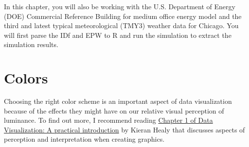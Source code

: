 \documentclass[
]{book}
\newenvironment{Shaded}{\begin{snugshade}}{\end{snugshade}}
\newcommand{\AttributeTok}[1]{\textcolor[rgb]{0.77,0.63,0.00}{#1}}
\newcommand{\DocumentationTok}[1]{\textcolor[rgb]{0.56,0.35,0.01}{\textbf{\textit{#1}}}}
\newcommand{\FunctionTok}[1]{\textcolor[rgb]{0.00,0.00,0.00}{#1}}
\newcommand{\NormalTok}[1]{#1}
\newcommand{\OtherTok}[1]{\textcolor[rgb]{0.56,0.35,0.01}{#1}}
\newcommand{\SpecialCharTok}[1]{\textcolor[rgb]{0.00,0.00,0.00}{#1}}
\newcommand{\StringTok}[1]{\textcolor[rgb]{0.31,0.60,0.02}{#1}}
\begin{document}
In this chapter, you will also be working with the U.S. Department of Energy (DOE) Commercial Reference Building for medium office energy model \citep{deru_us_2011} and the third and latest typical meteorological (TMY3) weather data for Chicago. You will first parse the IDf and EPW to R and run the simulation to extract the simulation results.

\begin{Shaded}
\end{Shaded}

\hypertarget{colors}{%
\section{Colors}\label{colors}}

Choosing the right color scheme is an important aspect of data visualization because of the effects they might have on our relative visual perception of luminance. To find out more, I recommend reading \href{https://socviz.co/lookatdata.html\#lookatdata}{Chapter 1 of Data Visualization: A practical introduction} by Kieran Healy \citep{healy_data_2018} that discusses aspects of perception and interpretation when creating graphics.
\end{document}
